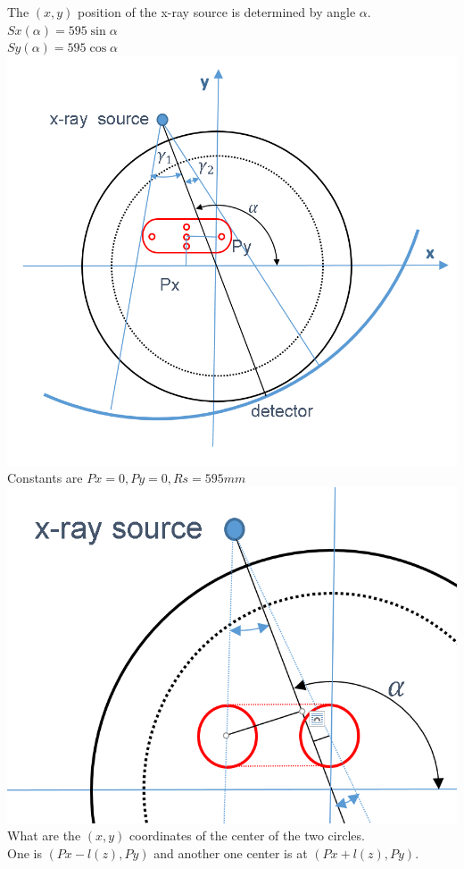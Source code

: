 \documentclass[12pt]{article}
\begin{document}
The $(x,y)$ position of the x-ray source is determined by angle $\alpha$.\\
$Sx(\alpha)=595\sin{\alpha}$\\
$Sy(\alpha)=595\cos{\alpha}$\\
\includegraphics[scale=0.5]{pic02.png}\\
Constants are $Px=0, Py=0, Rs=595 mm$ \\
\includegraphics[scale=0.5]{pic03.png}\\
What are the $(x,y)$ coordinates of the center of the two circles.\\
One is $(Px-l(z),Py)$ and another one center is at $(Px+l(z),Py)$.\\
\end{document}

